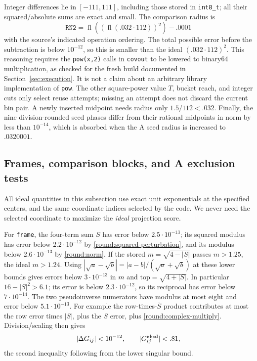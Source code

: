 Integer differences lie in $[-111,111]$, including those stored in
\texttt{int8\_t}; all their squared/absolute sums are exact and small.
The comparison radius is
\[
 \texttt{RN2}=\operatorname{fl}((\operatorname{fl}(.032\cdot112))^2)
              -.0001
\]
with the source's indicated operation ordering.  The total possible
error before the subtraction is below $10^{-12}$, so this is smaller
than the ideal $(.032\cdot112)^2$.  This reasoning requires the
\texttt{pow(x,2)} calls in \texttt{covout} to be lowered to binary64
multiplication, as checked for the fresh build documented in
Section~\ref{sec:execution}.  It is not a claim about an arbitrary
library implementation of \texttt{pow}.  The other square-power value
$T$, bucket reach, and integer cuts only select reuse attempts; missing
an attempt does not discard the current bin pair.  A newly inserted
midpoint needs radius only $1.5/112<.032$.  Finally, the nine
division-rounded seed phases differ from their rational midpoints in
norm by less than $10^{-14}$, which is absorbed when the A seed radius
is increased to $.0320001$.

\subsection{Frames, comparison blocks, and A exclusion tests}
\label{round:frames}

All ideal quantities in this subsection use exact unit exponentials
at the specified centers, and the same coordinate indices selected by
the code.  We never need the selected coordinate to maximize the
\emph{ideal} projection score.

For \texttt{frame}, the four-term sum $S$ has error below
$2.5\cdot10^{-13}$; its squared modulus has error below
$2.2\cdot10^{-12}$ by \eqref{round:squared-perturbation}, and its modulus
below $2.6\cdot10^{-13}$ by \eqref{round:norm}.  If the stored
$m=\sqrt{4-|S|}$ passes $m>1.25$, the ideal $m>1.24$.
Using $|\sqrt a-\sqrt b|=|a-b|/(\sqrt a+\sqrt b)$ at these lower
bounds gives errors below $3\cdot10^{-13}$ in $m$ and
$\mathrm{top}=\sqrt{4+|S|}$.
In particular $16-|S|^2>6.1$; its error is below
$2.3\cdot10^{-12}$, so its reciprocal has error below
$7\cdot10^{-14}$.  The two pseudoinverse numerators have modulus at
most eight and error below $5.1\cdot10^{-13}$.  For example the
row-times-$\overline S$ product contributes at most the row error
times $|S|$, plus the $S$ error, plus
\eqref{round:complex-multiply}.  Division/scaling then gives
\begin{equation}\label{round:frame-g}
 |\Delta G_{ij}|<10^{-12},\qquad |G_{ij}^{\rm ideal}|<.81,
\end{equation}
the second inequality following from the lower singular bound.

